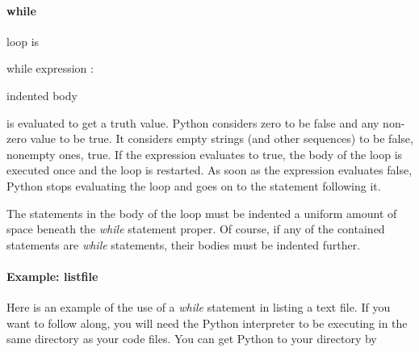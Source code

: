 \paragraph{while}
\label{while-statement}

 loop is

while expression :

 indented body

 is evaluated
to get a truth value. Python considers zero to be false and any non-zero
value to be true. It considers empty strings (and other sequences) to be
false, nonempty ones, true. If the expression evaluates to true, the
body of the loop is executed once and the loop is restarted. As soon as
the expression evaluates false, Python stops evaluating the loop and
goes on to the statement following it.

The statements in the body of the
loop must be indented a uniform amount of space beneath the \emph{while}
statement proper. Of course, if any of the contained statements are
\emph{while} statements, their bodies must be indented further.

\paragraph{Example: listfile}
\label{example-listfile}

Here is an example of the use of a
\emph{while} statement in listing a text file. If you want to follow
along, you will need the Python interpreter to be executing in the same
directory as your code files. You can get Python to your directory by

\endinput

\emph{import os}


\emph{os.chdir(``directory'')}

 in
module \emph{os} changes the current working directory. Now, suppose the
following code is in a file \emph{listfile.py} :

def listfile(name):

 f=open(name)

 L=f.readline()

 while L :

 print L,

 L=f.readline()

 f.close()

We can import it and use it to list
itself:


\emph{from listfile import listfile}


\emph{listfile(``listfile.py'')}

